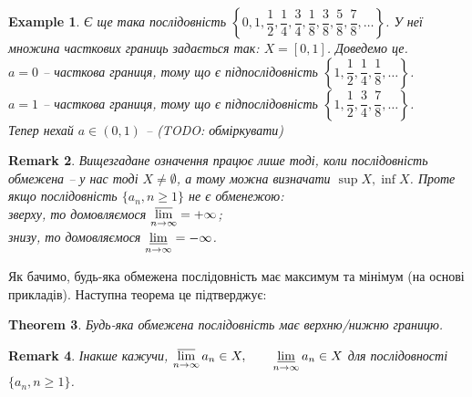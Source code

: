 \documentclass[a4paper, 14pt]{article}
\theoremstyle{theoremdd}
\newtheorem{theorem}{Theorem}[subsection]
\theoremstyle{theoremdd}
\theoremstyle{theoremdd}
\theoremstyle{theoremdd}
\newtheorem{example}[theorem]{Example}
\theoremstyle{theoremdd}
\theoremstyle{theoremdd}
\newtheorem{remark}[theorem]{Remark}
\theoremstyle{theoremdd}
\theoremstyle{theoremdd}
\begin{document}
	\begin{example}
	Є ще така послідовність $\left\{ 0, 1, \dfrac{1}{2}, \dfrac{1}{4}, \dfrac{3}{4}, \dfrac{1}{8}, \dfrac{3}{8}, \dfrac{5}{8}, \dfrac{7}{8}, \dots \right\}$. У неї множина часткових границь задається так: $X = [0,1]$. Доведемо це.\\
	$a = 0$ -- часткова границя, тому що є підпослідовність $\left\{ 1, \dfrac{1}{2}, \dfrac{1}{4}, \dfrac{1}{8}, \dots \right\}$.\\
	$a = 1$ -- часткова границя, тому що є підпослідовність $\left\{ 1, \dfrac{1}{2}, \dfrac{3}{4}, \dfrac{7}{8}, \dots \right\}$.\\
	Тепер нехай $a \in (0,1)$ -- \textit{(TODO: обміркувати)}
	\end{example}
	
	\begin{remark}
	Вищезгадане означення працює лише тоді, коли послідовність обмежена -- у нас тоді $X \neq \emptyset$, а тому можна визначати $\sup X, \inf X$. Проте якщо послідовність $\{a_n, n \geq 1\}$ не є обменежою:\\
	зверху, то домовляємося $\displaystyle \varlimsup_{n \to \infty} = +\infty$;\\
	знизу, то домовляємося $\displaystyle \varliminf_{n \to \infty} = -\infty$.
	\end{remark}
	
	Як бачимо, будь-яка обмежена послідовність має максимум та мінімум (на основі прикладів). Наступна теорема це підтверджує:
	
	\begin{theorem}
	Будь-яка обмежена послідовність має верхню/нижню границю.
	\end{theorem}
	
	\begin{remark}
	Інакше кажучи, $\displaystyle \varlimsup_{n \to \infty} a_n \in X, \qquad \varliminf_{n \to \infty} a_n \in X$ для послідовності $\{a_n, n \geq 1\}$.
	\end{remark}
	
\end{document}
